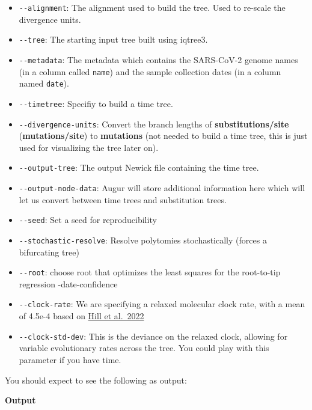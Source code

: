 \documentclass[
]{book}
\providecommand{\tightlist}{%
  \setlength{\itemsep}{0pt}\setlength{\parskip}{0pt}}
\begin{document}
\begin{itemize}
\tightlist
\item
  \texttt{-\/-alignment}: The alignment used to build the tree. Used to re-scale the divergence units.
\item
  \texttt{-\/-tree}: The starting input tree built using iqtree3.
\item
  \texttt{-\/-metadata}: The metadata which contains the SARS-CoV-2 genome names (in a column called \texttt{name}) and the sample collection dates (in a column named \texttt{date}).
\item
  \texttt{-\/-timetree}: Specifiy to build a time tree.
\item
  \texttt{-\/-divergence-units}: Convert the branch lengths of \textbf{substitutions/site} (\textbf{mutations/site}) to \textbf{mutations} (not needed to build a time tree, this is just used for visualizing the tree later on).
\item
  \texttt{-\/-output-tree}: The output Newick file containing the time tree.
\item
  \texttt{-\/-output-node-data}: Augur will store additional information here which will let us convert between time trees and substitution trees.
\item
  \texttt{-\/-seed}: Set a seed for reproducibility
\item
  \texttt{-\/-stochastic-resolve}: Resolve polytomies stochastically (forces a bifurcating tree)
\item
  \texttt{-\/-root}: choose root that optimizes the least squares for the root-to-tip regression
  -date-confidence
\item
  \texttt{-\/-clock-rate}: We are specifying a relaxed molecular clock rate, with a mean of 4.5e-4 based on \href{https://academic.oup.com/ve/article/8/2/veac080/6677185}{Hill et al.~2022}
\item
  \texttt{-\/-clock-std-dev}: This is the deviance on the relaxed clock, allowing for variable evolutionary rates across the tree. You could play with this parameter if you have time.
\end{itemize}

You should expect to see the following as output:

\textbf{Output}
\end{document}
